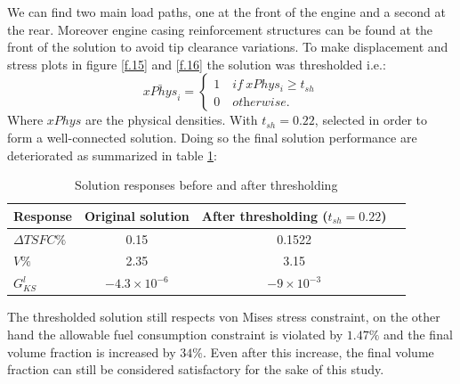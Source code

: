   We can find two main load paths, one at the front of the engine and a second at the rear. Moreover engine casing reinforcement structures can be found at the front of the solution to avoid tip clearance variations. 
 To make displacement and stress plots in figure \ref{f.15} and \ref{f.16} the solution was thresholded i.e.: 
  \begin{equation}
      \bar{xPhys}_i=\begin{cases}
             1 \quad \textit{if} \ xPhys_i\geq t_{sh}\\
             0 \quad \textit{otherwise.}
             \end{cases}
  \end{equation}
  Where $xPhys$ are the physical densities.
  With $t_{sh}=0.22$, selected in order to form a well-connected solution.
  Doing so the final solution performance are deteriorated as summarized in table \ref{tab:table3}:\\
  \begin{table}[h]
         \caption{\label{tab:table3} Solution responses before and after thresholding }
          \centering
          \begin{tabular}{lccc}
          \hline
           Response& Original solution& After thresholding ($t_{sh}=0.22$) \\\hline
         $\Delta TSFC \%$ & 0.15 & 0.1522 \\
         $V \%$ & 2.35 & 3.15 \\
         $G_{KS}^l$ & $-4.3\times 10^{-6}$ & $-9\times 10^{-3}$ \\
          \hline
          \end{tabular}
          \end{table} 
 The thresholded solution still respects von Mises stress constraint, on the other hand the allowable fuel consumption constraint is violated by $1.47\%$ and the final volume fraction is increased by $34\%$. Even after this increase, the final volume fraction can still be considered satisfactory for the sake of this study. 
 
